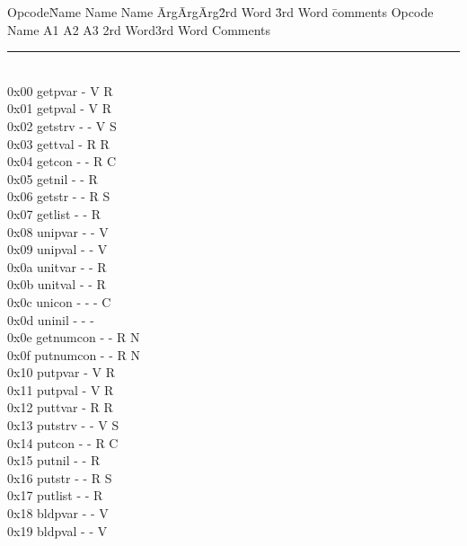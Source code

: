 \documentclass[11pt]{article}
\begin{document}
\begin{tabbing}
Opcode\= Name Name Name \=Arg\=Arg\=Arg\= 2rd Word \= 3rd Word \= comments\kill
Opcode\> Name	\>A1 \>A2 \>A3 \>2rd Word\>3rd Word\>\hspace*{3em} Comments \\
\rule{\textwidth}{.01in}\\
0x00  \> getpvar	\> - \> V \> R \>   \>	 \>		\\
0x01  \> getpval	\> - \> V \> R \>   \>	 \>		\\
0x02  \> getstrv	\> - \> - \> V \> S \>   \>		\\
0x03  \> gettval	\> - \> R \> R \>   \>	 \>		\\
0x04  \> getcon		\> - \> - \> R \> C \>   \>		\\
0x05  \> getnil		\> - \> - \> R \>   \>   \>		\\
0x06  \> getstr		\> - \> - \> R \> S \>	 \>		\\
0x07  \> getlist	\> - \> - \> R \>   \>   \>		\\
0x08  \> unipvar	\> - \> - \> V \>   \>	 \>		\\
0x09  \> unipval	\> - \> - \> V \>   \>	 \>		\\
0x0a  \> unitvar	\> - \> - \> R \>   \>	 \>		\\
0x0b  \> unitval	\> - \> - \> R \>   \>	 \>		\\
0x0c  \> unicon		\> - \> - \> - \> C \>   \>		\\
0x0d  \> uninil		\> - \> - \> - \>   \>   \>		\\
0x0e  \> getnumcon	\> - \> - \> R \> N \>   \>		\\
0x0f  \> putnumcon	\> - \> - \> R \> N \>   \>		\\
0x10  \> putpvar	\> - \> V \> R \>   \>	 \>		\\
0x11  \> putpval	\> - \> V \> R \>   \>	 \>		\\
0x12  \> puttvar	\> - \> R \> R \>   \>	 \>		\\
0x13  \> putstrv	\> - \> - \> V \> S \>   \>		\\
0x14  \> putcon		\> - \> - \> R \> C \>   \>		\\
0x15  \> putnil		\> - \> - \> R \>   \>	 \>		\\
0x16  \> putstr		\> - \> - \> R \> S \>   \>		\\
0x17  \> putlist	\> - \> - \> R \>   \>	 \>		\\
0x18  \> bldpvar	\> - \> - \> V \>   \>   \>		\\
0x19  \> bldpval	\> - \> - \> V \>   \>   \>		\\

\end{tabbing}
\end{document}
